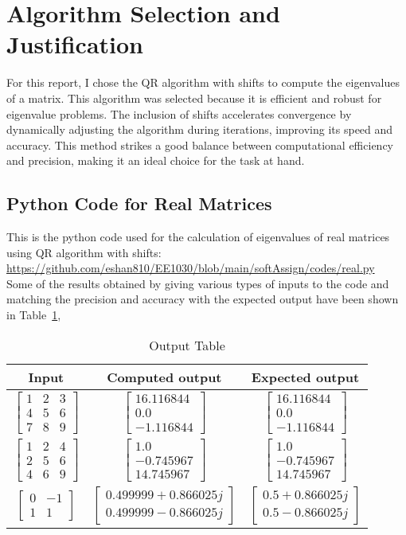 \documentclass[12pt]{article}
\newcommand{\myvec}[1]{\begin{bmatrix} #1 \end{bmatrix}}
\begin{document}
\section{Algorithm Selection and Justification}
For this report, I chose the QR algorithm with shifts to compute the eigenvalues of a matrix. This algorithm was selected because it is efficient and robust for eigenvalue problems. The inclusion of shifts accelerates convergence by dynamically adjusting the algorithm during iterations, improving its speed and accuracy. This method strikes a good balance between computational efficiency and precision, making it an ideal choice for the task at hand.

\subsection{Python Code for Real Matrices}
This is the python code used for the calculation of eigenvalues of real matrices using QR algorithm with shifts: \\
\url{https://github.com/eshan810/EE1030/blob/main/softAssign/codes/real.py}\\

Some of the results obtained by giving various types of inputs to the code and matching the precision and accuracy with the expected output have been shown in Table~\ref{Table 1},


\begin{table}[H]
\centering
\begin{tabular}{|c|c|c|}
\hline
\textbf{Input} & \textbf{Computed output} & \textbf{Expected output} \\
\hline
$\myvec{1 &2 &3\\4&5 &6\\7&8&9}$ & $\myvec{16.116844\\ 0.0\\-1.116844}$ & $\myvec{16.116844\\ 0.0\\-1.116844}$ \\ \hline
$\myvec{1&2&4\\2&5&6\\4&6&9}$ & $\myvec{1.0\\ -0.745967\\ 14.745967}$ & $\myvec{1.0\\ -0.745967\\ 14.745967}$ \\ \hline
$\myvec{0&-1\\1&1}$ & $\myvec{0.499999+0.866025j\\0.499999-0.866025j}$ &$\myvec{0.5+0.866025j\\0.5-0.866025j}$\\ \hline
\end{tabular}
\caption{Output Table}
\label{Table 1}
\end{table}
\end{document}
